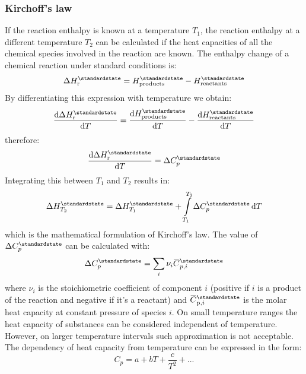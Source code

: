 \documentclass[12pt,a4paper]{report}
\newcommand*\diff{\mathop{}\!\mathrm{d}}
\newcommand{\overbar}[1]{\mkern 1.5mu\overline{\mkern-1.5mu#1\mkern-1.5mu}\mkern 1.5mu}
\begin{document}
   \subsubsection*{Kirchoff's law}
   If the reaction enthalpy is known at a temperature $T_{1}$, the reaction enthalpy at a different temperature $T_{2}$ can be calculated if the heat capacities of all the chemical species involved in the reaction are known. The enthalpy change of a chemical reaction under standard conditions is:
   \begin{equation*}
   \Delta H^{\standardstate}_{\mathrm{r}}=H^{\standardstate}_{\mathrm{products}}-H^{\standardstate}_{\mathrm{reactants}}
   \end{equation*}
   By differentiating this expression with temperature we obtain:
   \begin{equation*}
   \frac{\diff\Delta H^{\standardstate}_{\mathrm{r}}}{\diff T}=\frac{\diff H^{\standardstate}_{\mathrm{products}}}{\diff T}-\frac{\diff H^{\standardstate}_{\mathrm{reactants}}}{\diff T}
   \end{equation*}
   therefore:
   \begin{equation*}
   \frac{\diff\Delta H^{\standardstate}_{\mathrm{r}}}{\diff T}=\Delta C^{\standardstate}_{p}
   \end{equation*}
   Integrating this between $T_{1}$ and $T_{2}$ results in:
   \begin{equation*}
   \Delta H^{\standardstate}_{T_{2}}=\Delta H^{\standardstate}_{T_{1}}+\int\limits_{T_{1}}^{T_{2}}\Delta C^{\standardstate}_{p}\diff T
   \end{equation*}
   which is the mathematical formulation of Kirchoff's law.
   The value of $\Delta C^{\standardstate}_{p}$ can be calculated with:
   \begin{equation*}
   \Delta C^{\standardstate}_{p}=\sum\limits_{i}\nu_{i}\overbar{C}^{\standardstate}_{p,i}
   \end{equation*}
   where $\nu_{i}$ is the stoichiometric coefficient of component $i$ (positive if $i$ is a product of the reaction and negative if it's a reactant) and $\overbar{C}^{\standardstate}_{\mathrm{p},i}$ is the molar heat capacity at constant pressure of species $i$.
   On small temperature ranges the heat capacity of substances can be considered independent of temperature. However, on larger temperature intervals such approximation is not acceptable. The dependency of heat capacity from temperature can be expressed in the form:
  \begin{equation*}
  C_{p}=a+bT+\frac{c}{T^{2}}+...
  \end{equation*}
\end{document}
